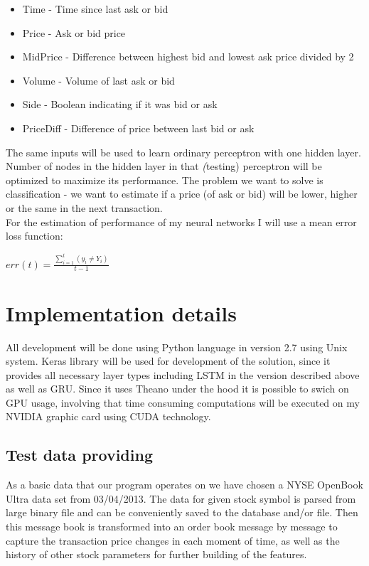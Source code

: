 \documentclass[twoside]{article}
\begin{document}
\begin{multicols}{2}
\begin{itemize}
\item Time - Time since last ask or bid
\item Price - Ask or bid price
\item MidPrice - Difference between highest bid and lowest ask price divided by 2
\item Volume - Volume of last ask or bid
\item Side - Boolean indicating if it was bid or ask
\item PriceDiff - Difference of price between last bid or ask
\end{itemize}

The same inputs will be used to learn ordinary perceptron with one hidden layer. 
Number of nodes in the hidden layer in that \emph(testing) perceptron will be optimized 
to maximize its performance. The problem we want to solve is classification - we want to estimate
if a price (of ask or bid) will be lower, higher or the same in the next transaction. \\
\newline
For the estimation of performance of my neural networks I will use a mean error loss function: \\
\newline
\begin{center}
$ err(t) = \frac{\sum\limits_{i=1}^t (y_{i} \neq Y_{i})}{t - 1} $
\end{center}

\section{Implementation details}

All development will be done using Python language in version 2.7 using Unix system.
Keras library will be used for development of the solution, since it provides all necessary 
layer types including LSTM in the version described above as well as GRU. Since it uses 
Theano under the hood it is possible to swich on GPU usage, involving that time consuming 
computations will be executed on my NVIDIA graphic card using CUDA technology.

\subsection{Test data providing}
As a basic data that our program operates on we have chosen a NYSE OpenBook Ultra data set from 03/04/2013. The data for given stock symbol is parsed from large binary file and can be conveniently saved to the database and/or file. Then this message book is transformed into an order book message by message to capture the transaction price changes in each moment of time, as well as the history of other stock parameters for further building of the features.


\end{multicols}
\end{document}
